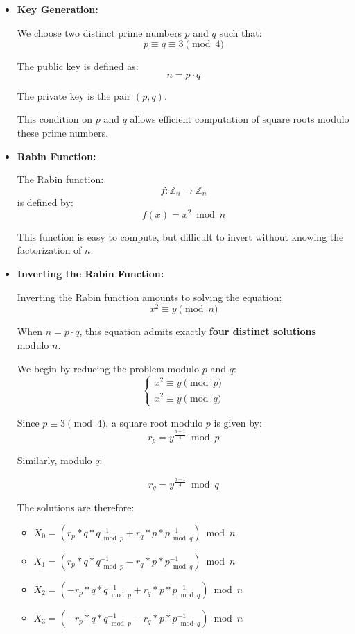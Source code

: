 \documentclass[9pt]{extarticle}
\begin{document}
\begin{itemize}
\item\textbf{Key Generation:}

We choose two distinct prime numbers $p$ and $q$ such that:
\[
p \equiv q \equiv 3 \pmod{4}
\]

The public key is defined as:
\[
n = p \cdot q
\]

The private key is the pair $(p, q)$.

This condition on $p$ and $q$ allows efficient computation of square roots modulo these prime numbers.\\

\item\textbf{Rabin Function:}

The Rabin function:
\[
f : \mathbb{Z}_n \rightarrow \mathbb{Z}_n
\]
is defined by:
\[
f(x) = x^2 \bmod n
\]

This function is easy to compute, but difficult to invert without knowing the factorization of $n$.\\

\item\textbf{Inverting the Rabin Function:}

Inverting the Rabin function amounts to solving the equation:
\[
x^2 \equiv y \pmod{n}
\]

When $n = p \cdot q$, this equation admits exactly \textbf{four distinct solutions} modulo $n$.


We begin by reducing the problem modulo $p$ and $q$:
\[
\begin{cases}
x^2 \equiv y \pmod{p} \\
x^2 \equiv y \pmod{q}
\end{cases}
\]

Since $p \equiv 3 \pmod{4}$, a square root modulo $p$ is given by:
\[
r_p = y^{\frac{p+1}{4}} \bmod p
\]

Similarly, modulo $q$:

\[
r_q = y^{\frac{q+1}{4}} \bmod q
\]

The solutions are therefore:

\begin{itemize}
  \item $X_0 = (r_p * q * q^{-1}_{\bmod p} + r_q * p * p^{-1}_{\bmod q}) \bmod n $

  \item $X_1 = (r_p * q * q^{-1}_{\bmod p} - r_q * p * p^{-1}_{\bmod q}) \bmod n$

  \item $X_2 = (-r_p * q * q^{-1}_{\bmod p} + r_q * p * p^{-1}_{\bmod q}) \bmod n$

  \item $X_3 = (-r_p * q * q^{-1}_{\bmod p} - r_q * p * p^{-1}_{\bmod q}) \bmod n$
\end{itemize}

\end{itemize}
\end{document}
